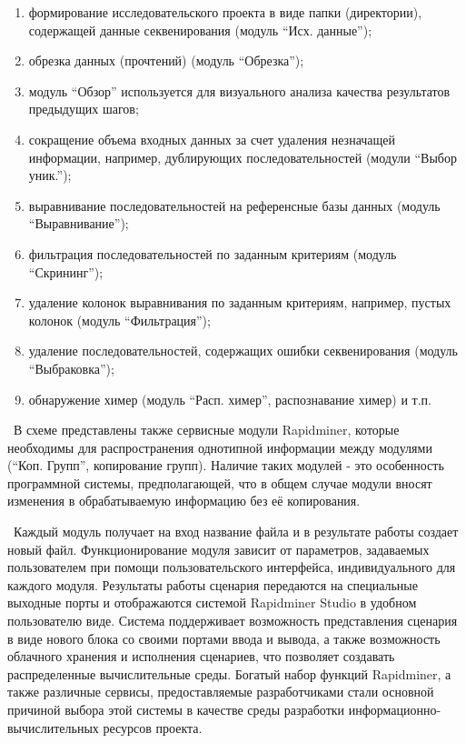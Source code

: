 \documentclass[a4paper,12pt,openany,final]{extreport}
\begin{document}
\begin{enumerate}
\def\labelenumi{\arabic{enumi}.}
\item
  формирование исследовательского проекта в виде папки (директории),
  содержащей данные секвенирования (модуль ``Исх. данные'');
\item
  обрезка данных (прочтений) (модуль ``Обрезка'');
\item
  модуль ``Обзор'' используется для визуального анализа качества
  результатов предыдущих шагов;
\item
  сокращение объема входных данных за счет удаления незначащей
  информации, например, дублирующих последовательностей (модули ``Выбор
  уник.'');
\item
  выравнивание последовательностей на референсные базы данных (модуль
  ``Выравнивание'');
\item
  фильтрация последовательностей по заданным критериям (модуль
  ``Скрининг'');
\item
  удаление колонок выравнивания по заданным критериям, например, пустых
  колонок (модуль ``Фильтрация'');
\item
  удаление последовательностей, содержащих ошибки секвенирования (модуль
  ``Выбраковка'');
\item
  обнаружение химер (модуль ``Расп. химер'', распознавание химер) и т.п.
\end{enumerate}

~В схеме представлены также сервисные модули Rapidminer, которые
необходимы для распространения однотипной информации между модулями
(``Коп. Групп'', копирование групп). Наличие таких модулей - это
особенность программной системы, предполагающей, что в общем случае
модули вносят изменения в обрабатываемую информацию без её копирования.

~Каждый модуль получает на вход название файла и в результате работы
создает новый файл. Функционирование модуля зависит от параметров,
задаваемых пользователем при помощи пользовательского интерфейса,
индивидуального для каждого модуля. Результаты работы сценария
передаются на специальные выходные порты и отображаются системой
Rapidminer Studio в удобном пользователю виде. Система поддерживает
возможность представления сценария в виде нового блока со своими портами
ввода и вывода, а также возможность облачного хранения и исполнения
сценариев, что позволяет создавать распределенные вычислительные среды.
Богатый набор функций Rapidminer, а также различные сервисы,
предоставляемые разработчиками стали основной причиной выбора этой
системы в качестве среды разработки информационно-вычислительных
ресурсов проекта.
\end{document}
